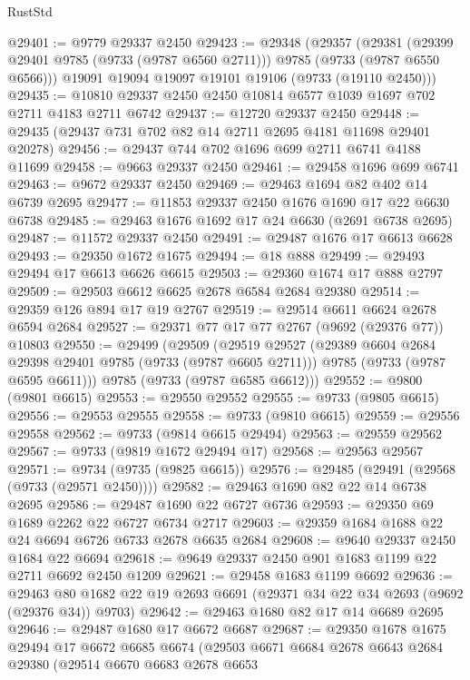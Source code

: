 \begin{lexlean}{RustStd}
\begin{coremodule}
@29401 := @9779 @29337 @2450
@29423 := @29348
    (@29357
      (@29381 (@29399 @29401 @9785 (@9733 (@9787 @6560 @2711))) @9785 (@9733 (@9787 @6550 @6566)))
      @19091
      @19094
      @19097
      @19101
      @19106
      (@9733 (@19110 @2450)))
@29435 := @10810 @29337 @2450 @2450 @10814 @6577 @1039 @1697 @702 @2711 @4183 @2711 @6742
@29437 := @12720 @29337 @2450
@29448 := @29435 (@29437 @731 @702 @82 @14 @2711 @2695 @4181 @11698 @29401 @20278)
@29456 := @29437 @744 @702 @1696 @699 @2711 @6741 @4188 @11699
@29458 := @9663 @29337 @2450
@29461 := @29458 @1696 @699 @6741
@29463 := @9672 @29337 @2450
@29469 := @29463 @1694 @82 @402 @14 @6739 @2695
@29477 := @11853 @29337 @2450 @1676 @1690 @17 @22 @6630 @6738
@29485 := @29463 @1676 @1692 @17 @24 @6630 (@2691 @6738 @2695)
@29487 := @11572 @29337 @2450
@29491 := @29487 @1676 @17 @6613 @6628
@29493 := @29350 @1672 @1675
@29494 := @18 @888
@29499 := @29493 @29494 @17 @6613 @6626 @6615
@29503 := @29360 @1674 @17 @888 @2797
@29509 := @29503 @6612 @6625 @2678 @6584 @2684 @29380
@29514 := @29359 @126 @894 @17 @19 @2767
@29519 := @29514 @6611 @6624 @2678 @6594 @2684
@29527 := @29371 @77 @17 @77 @2767 (@9692 (@29376 @77)) @10803
@29550 := @29499
    (@29509
      (@29519
        @29527
        (@29389 @6604 @2684 @29398 @29401 @9785 (@9733 (@9787 @6605 @2711)))
        @9785
        (@9733 (@9787 @6595 @6611)))
      @9785
      (@9733 (@9787 @6585 @6612)))
@29552 := @9800 (@9801 @6615)
@29553 := @29550 @29552
@29555 := @9733 (@9805 @6615)
@29556 := @29553 @29555
@29558 := @9733 (@9810 @6615)
@29559 := @29556 @29558
@29562 := @9733 (@9814 @6615 @29494)
@29563 := @29559 @29562
@29567 := @9733 (@9819 @1672 @29494 @17)
@29568 := @29563 @29567
@29571 := @9734 (@9735 (@9825 @6615))
@29576 := @29485 (@29491 (@29568 (@9733 (@29571 @2450))))
@29582 := @29463 @1690 @82 @22 @14 @6738 @2695
@29586 := @29487 @1690 @22 @6727 @6736
@29593 := @29350 @69 @1689 @2262 @22 @6727 @6734 @2717
@29603 := @29359 @1684 @1688 @22 @24 @6694 @6726 @6733 @2678 @6635 @2684
@29608 := @9640 @29337 @2450 @1684 @22 @6694
@29618 := @9649 @29337 @2450 @901 @1683 @1199 @22 @2711 @6692 @2450 @1209
@29621 := @29458 @1683 @1199 @6692
@29636 := @29463 @80 @1682 @22 @19 @2693 @6691 (@29371 @34 @22 @34 @2693 (@9692 (@29376 @34)) @9703)
@29642 := @29463 @1680 @82 @17 @14 @6689 @2695
@29646 := @29487 @1680 @17 @6672 @6687
@29687 := @29350
    @1678
    @1675
    @29494
    @17
    @6672
    @6685
    @6674
    (@29503
      @6671
      @6684
      @2678
      @6643
      @2684
      @29380
      (@29514
        @6670
        @6683
        @2678
        @6653

\end{coremodule}
\end{lexlean}
